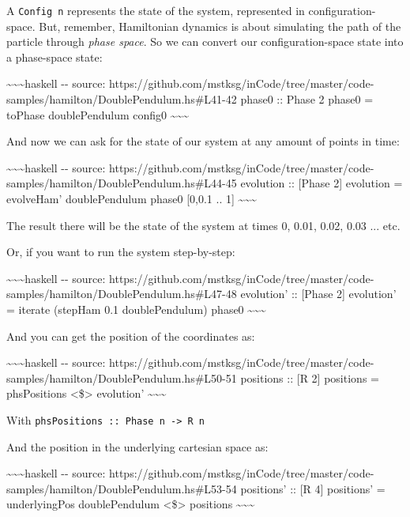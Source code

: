 \documentclass[]{article}
\begin{document}
A \texttt{Config\ n} represents the state of the system, represented in
configuration-space. But, remember, Hamiltonian dynamics is about simulating the
path of the particle through \emph{phase space}. So we can convert our
configuration-space state into a phase-space state:

\textasciitilde{}\textasciitilde{}\textasciitilde{}haskell -\/- source:
https://github.com/mstksg/inCode/tree/master/code-samples/hamilton/DoublePendulum.hs\#L41-42
phase0 :: Phase 2 phase0 = toPhase doublePendulum config0
\textasciitilde{}\textasciitilde{}\textasciitilde{}

And now we can ask for the state of our system at any amount of points in time:

\textasciitilde{}\textasciitilde{}\textasciitilde{}haskell -\/- source:
https://github.com/mstksg/inCode/tree/master/code-samples/hamilton/DoublePendulum.hs\#L44-45
evolution :: {[}Phase 2{]} evolution = evolveHam' doublePendulum phase0 {[}0,0.1
.. 1{]} \textasciitilde{}\textasciitilde{}\textasciitilde{}

The result there will be the state of the system at times 0, 0.01, 0.02, 0.03
... etc.

Or, if you want to run the system step-by-step:

\textasciitilde{}\textasciitilde{}\textasciitilde{}haskell -\/- source:
https://github.com/mstksg/inCode/tree/master/code-samples/hamilton/DoublePendulum.hs\#L47-48
evolution' :: {[}Phase 2{]} evolution' = iterate (stepHam 0.1 doublePendulum)
phase0 \textasciitilde{}\textasciitilde{}\textasciitilde{}

And you can get the position of the coordinates as:

\textasciitilde{}\textasciitilde{}\textasciitilde{}haskell -\/- source:
https://github.com/mstksg/inCode/tree/master/code-samples/hamilton/DoublePendulum.hs\#L50-51
positions :: {[}R 2{]} positions = phsPositions \textless{}\$\textgreater{}
evolution' \textasciitilde{}\textasciitilde{}\textasciitilde{}

With \texttt{phsPositions\ ::\ Phase\ n\ -\textgreater{}\ R\ n}

And the position in the underlying cartesian space as:

\textasciitilde{}\textasciitilde{}\textasciitilde{}haskell -\/- source:
https://github.com/mstksg/inCode/tree/master/code-samples/hamilton/DoublePendulum.hs\#L53-54
positions' :: {[}R 4{]} positions' = underlyingPos doublePendulum
\textless{}\$\textgreater{} positions
\textasciitilde{}\textasciitilde{}\textasciitilde{}
\end{document}
